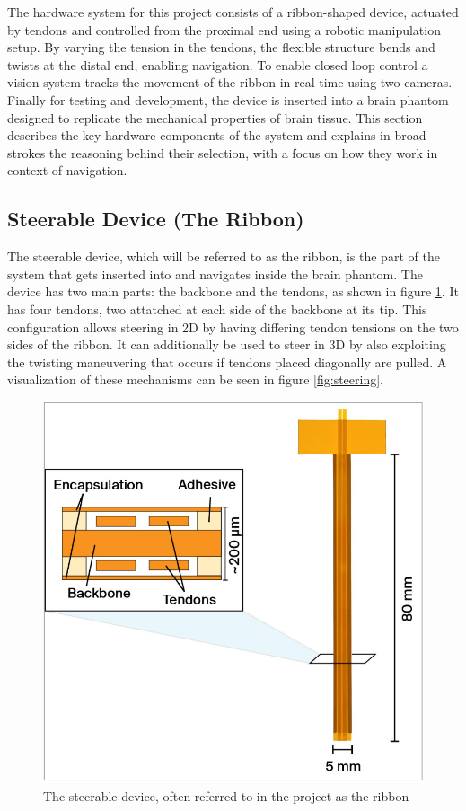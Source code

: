The hardware system for this project consists of a ribbon-shaped device, actuated by tendons and controlled from the proximal end using a robotic manipulation setup. By varying the tension in the tendons, the flexible structure bends and twists at the distal end, enabling navigation. To enable closed loop control a vision system tracks the movement of the ribbon in real time using two cameras. Finally for testing and development, the device is inserted into a brain phantom designed to replicate the mechanical properties of brain tissue. This section describes the key hardware components of the system and explains in broad strokes the reasoning behind their selection, with a focus on how they work in context of navigation.


\subsection{Steerable Device (The Ribbon)}
The steerable device, which will be referred to as the ribbon, is the part of the system that gets inserted into and navigates inside the brain phantom. The device has two main parts: the backbone and the tendons, as shown in figure \ref{fig:ribbon}. It has four tendons, two attatched at each side of the backbone at its tip. This configuration allows steering in 2D by having differing tendon tensions on the two sides of the ribbon. It can additionally be used to steer in 3D by also exploiting the twisting maneuvering that occurs if tendons placed diagonally are pulled. A visualization of these mechanisms can be seen in figure \ref{fig:steering}.
\begin{figure} [H]
    \centering
    \includegraphics[width=0.55\linewidth]{images/Hardware/ribbon.PNG}
    \caption{The steerable device, often referred to in the project as the ribbon}
    \label{fig:ribbon}
\end{figure}
